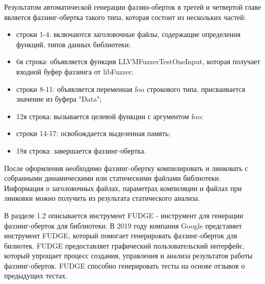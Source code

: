Результатом автоматической генерации фаззин-оберток в третей и четвертой главе является фаззинг-обертка такого типа, которая состоит из нескольких частей:
\begin{itemize}
    \item строки 1-4: включаются заголовочные файлы, содержащие определения функций, типов данных библиотеки;
    \item 6я строка: объявляется функция LLVMFuzzerTestOneInput, которая получает входной буфер фаззинга от libFuzzer;
    \item строки 8-11: объявляется переменная foo строкового типа, присваивается значение из буфера "Data";
    \item 12я строка: вызывается целевой функции с аргументом foo;
    \item строки 14-17: освобождается выделенная память;
    \item 18я строка: завершается фаззинг-обертка.
\end{itemize}

После оформления необходимо фаззинг-обертку  компилировать и линковать  с собранными динамическими или статическими файлами библиотеки. Информация о заголовочных файлах, параметрах компиляции и файлах при линковки можно получить из результата статического анализа. 

В разделе 1.2 описывается инструмент FUDGE - инструмент для генерации фаззинг-оберток для библиотеки. В 2019 году компания Google представяет инструмент FUDGE, который помогает генерировать фаззинг-оберток для билиотек. FUDGE предоставляет графический пользовательский интерфейс, который упрощает процесс создания, управления и анализа результатов работы фаззинг-оберток. FUDGE способно генерировать тесты на основе отзывов о предыдущих тестах.

